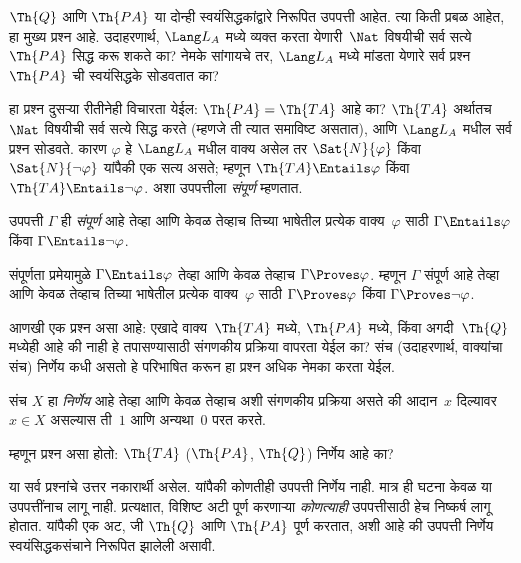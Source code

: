 $\Th{Q}$ आणि $\Th{PA}$ या दोन्ही स्वयंसिद्धकांद्वारे निरूपित
उपपत्ती आहेत. त्या किती प्रबळ आहेत, हा मुख्य प्रश्न आहे.
उदाहरणार्थ, $\Lang L_A$ मध्ये व्यक्त करता येणारी~$\Nat$ विषयीची
सर्व सत्ये $\Th{PA}$ सिद्ध करू शकते का? नेमके सांगायचे तर,
$\Lang L_A$ मध्ये मांडता येणारे सर्व प्रश्न $\Th{PA}$ ची
स्वयंसिद्धके सोडवतात का?

हा प्रश्न दुसऱ्या रीतीनेही विचारता येईल: $\Th{PA} = \Th{TA}$
आहे का? $\Th{TA}$ अर्थातच~$\Nat$ विषयीची सर्व सत्ये सिद्ध
करते (म्हणजे ती त्यात समाविष्ट असतात), आणि $\Lang L_A$ मधील
सर्व प्रश्न सोडवते. कारण $\varphi$ हे $\Lang L_A$ मधील वाक्य
असेल तर $\Sat{N}{\varphi}$ किंवा $\Sat{N}{\lnot \varphi}$ यांपैकी
एक सत्य असते; म्हणून $\Th{TA}
\Entails \varphi$ किंवा $\Th{TA} \Entails \lnot \varphi$. अशा उपपत्तीला
\emph{संपूर्ण} म्हणतात.

\begin{defn}
उपपत्ती $\Gamma$ ही \emph{संपूर्ण} आहे तेव्हा आणि केवळ तेव्हाच तिच्या
भाषेतील प्रत्येक वाक्य~$\varphi$ साठी $\Gamma \Entails \varphi$
किंवा $\Gamma \Entails \lnot \varphi$.
\end{defn}

\begin{explain}
संपूर्णता प्रमेयामुळे $\Gamma \Entails \varphi$ तेव्हा आणि केवळ तेव्हाच
$\Gamma \Proves
\varphi$. म्हणून $\Gamma$ संपूर्ण आहे तेव्हा आणि केवळ तेव्हाच तिच्या भाषेतील
प्रत्येक वाक्य~$\varphi$ साठी $\Gamma \Proves \varphi$ किंवा
$\Gamma \Proves \lnot \varphi$.
\end{explain}

आणखी एक प्रश्न असा आहे: एखादे वाक्य~$\Th{TA}$ मध्ये,
$\Th{PA}$ मध्ये, किंवा अगदी~$\Th{Q}$ मध्येही आहे की नाही हे
तपासण्यासाठी संगणकीय प्रक्रिया वापरता येईल का? संच (उदाहरणार्थ,
वाक्यांचा संच) निर्णेय कधी असतो हे परिभाषित करून हा
प्रश्न अधिक नेमका करता येईल.

\begin{defn}
संच $X$ हा \emph{निर्णेय} आहे तेव्हा आणि केवळ तेव्हाच अशी संगणकीय प्रक्रिया
असते की आदान~$x$ दिल्यावर $x \in X$ असल्यास ती~$1$ आणि
अन्यथा~$0$ परत करते.
\end{defn}

म्हणून प्रश्न असा होतो: $\Th{TA}$ ($\Th{PA}$, $\Th{Q}$) निर्णेय आहे का?

या सर्व प्रश्नांचे उत्तर नकारार्थी असेल. यांपैकी कोणतीही उपपत्ती
निर्णेय नाही. मात्र ही घटना केवळ या उपपत्तींनाच लागू नाही. प्रत्यक्षात,
विशिष्ट अटी पूर्ण करणाऱ्या \emph{कोणत्याही} उपपत्तीसाठी हेच निष्कर्ष
लागू होतात. यांपैकी एक अट, जी $\Th{Q}$ आणि $\Th{PA}$ पूर्ण करतात,
अशी आहे की उपपत्ती निर्णेय स्वयंसिद्धकसंचाने निरूपित झालेली असावी.

